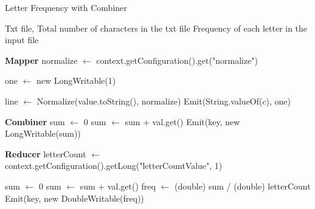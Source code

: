 \begin{algorithm}[H]
    \caption{Letter Frequency with Combiner}
    \begin{algorithmic}[1]
        \Require Txt file, Total number of characters in the txt file
        \Ensure Frequency of each letter in the input file

        \vspace{1em}

        \Statex
        \noindent \textbf{Mapper}
        \State normalize $\leftarrow$ context.getConfiguration().get("normalize")

        \State one $\leftarrow$ new LongWritable(1)

        \EndProcedure

        \vspace{1em}

        \State line $\leftarrow$ Normalize(value.toString(), normalize) 
        \State Emit(String.valueOf($c$), one)
        \EndFor
        \EndProcedure

        \vspace{1em}

        \Statex
        \noindent \textbf{Combiner}
        \State sum $\leftarrow$ 0
        \State sum $\leftarrow$ sum + val.get()
        \EndFor
        \State Emit(key, new LongWritable(sum))
        \EndProcedure

        \vspace{1em}

        \Statex
        \noindent \textbf{Reducer}
        \State letterCount $\leftarrow$ context.getConfiguration().getLong("letterCountValue", 1)
        \EndProcedure

        \vspace{1em}

        \State sum $\leftarrow$ 0
        \State sum $\leftarrow$ sum + val.get()
        \EndFor
        \State freq $\leftarrow$ (double) sum / (double) letterCount
        \State Emit(key, new DoubleWritable(freq))
        \EndProcedure
    \end{algorithmic}
\end{algorithm}
